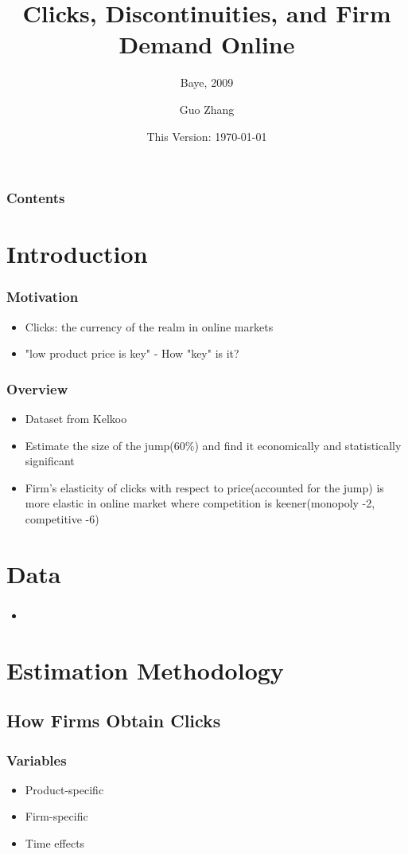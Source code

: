 \documentclass{beamer}
\title{Clicks, Discontinuities, and Firm
Demand Online}
\subtitle{Baye, 2009}
\author{Guo Zhang}
\institute[Universities of]
{
WISE, Xiamen University
}
\date{This Version: \today}
\begin{document}
\begin{frame}[plain]
\titlepage
\end{frame}

\begin{frame}[plain] %
\frametitle{Contents}
\begin{multicols}{2}
  \tableofcontents
\end{multicols}
\end{frame}

\section{Introduction}
\begin{frame}
\frametitle{Motivation}
\begin{itemize}
\item Clicks: the currency of the realm in online markets
\item "low product price is key" - How "key" is it?
\end{itemize}
\end{frame}

\begin{frame}
\frametitle{Overview}
\begin{itemize}
\item Dataset from Kelkoo
\item Estimate the size of the jump(60\%) and find it economically and statistically significant
\item Firm's elasticity of clicks with respect to price(accounted for the jump) is more elastic in online market where competition is keener(monopoly -2, competitive -6)
\end{itemize}
\end{frame}

\section{Data}
\begin{frame}
\frametitle{}
\begin{itemize}
\item 
\end{itemize}
\end{frame}

\section{Estimation Methodology}
\subsection{How Firms Obtain Clicks}
\begin{frame}
\frametitle{Variables}
\begin{itemize}
\item Product-specific
\item Firm-specific
\item Time effects
\end{itemize}
\end{frame}
\end{document}

